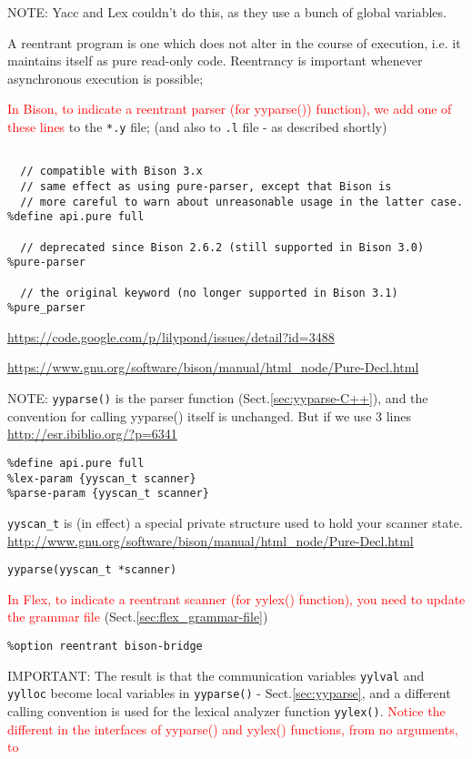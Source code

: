NOTE: Yacc and Lex couldn't do this, as they use a bunch of global variables.

A reentrant program is one which does not alter in the course of execution, i.e.
it maintains itself as pure read-only code. Reentrancy is important whenever
asynchronous execution is possible;

\textcolor{red}{In Bison, to indicate a reentrant parser (for yyparse())
function), we add one of these lines} to the \verb!*.y! file; (and also to
\verb!.l! file - as described shortly)
\begin{verbatim}

  // compatible with Bison 3.x
  // same effect as using pure-parser, except that Bison is 
  // more careful to warn about unreasonable usage in the latter case.
%define api.pure full

  // deprecated since Bison 2.6.2 (still supported in Bison 3.0)
%pure-parser

  // the original keyword (no longer supported in Bison 3.1)  
%pure_parser
\end{verbatim}
\url{https://code.google.com/p/lilypond/issues/detail?id=3488}

\url{https://www.gnu.org/software/bison/manual/html_node/Pure-Decl.html}

NOTE: \verb!yyparse()! is the parser function (Sect.\ref{sec:yyparse-C++}),
and the convention for calling yyparse() itself is unchanged. But if we use 3
lines \url{http://esr.ibiblio.org/?p=6341}
\begin{verbatim}
%define api.pure full
%lex-param {yyscan_t scanner}
%parse-param {yyscan_t scanner}
\end{verbatim}
\verb!yyscan_t! is (in effect) a special private structure used to hold your
scanner state. 
\url{http://www.gnu.org/software/bison/manual/html_node/Pure-Decl.html}
\begin{verbatim}
yyparse(yyscan_t *scanner)
\end{verbatim}


\textcolor{red}{In Flex, to indicate a reentrant scanner (for yylex()
function), you need to update the grammar file}
(Sect.\ref{sec:flex_grammar-file})
\begin{verbatim}
%option reentrant bison-bridge
\end{verbatim}

IMPORTANT: The result is that the communication variables \verb!yylval! and
\verb!yylloc! become local variables in \verb!yyparse()! - Sect.\ref{sec:yyparse}, and a different
calling convention is used for the lexical analyzer function \verb!yylex()!.
\textcolor{red}{Notice the different in the interfaces of yyparse() and yylex()
functions, from no arguments, to}

